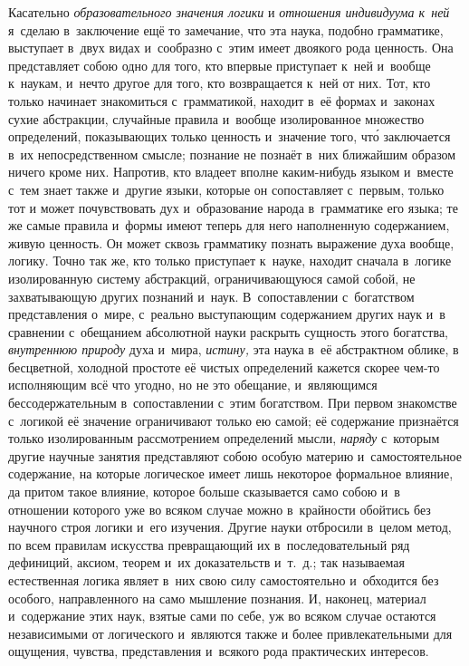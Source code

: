 Касательно {\em образовательного значения логики} и
{\em отношения индивидуума к~ней} я~сделаю в~заключение
ещё то замечание, что эта наука, подобно грамматике, выступает в~двух видах
и~сообразно с~этим имеет двоякого рода ценность. Она представляет собою
одно для того, кто впервые приступает к~ней и~вообще к~наукам, и~нечто
другое для того, кто возвращается к~ней от них. Тот, кто только начинает
знакомиться с~грамматикой, находит в~её формах и~законах сухие абстракции,
случайные правила и~вообще изолированное множество определений,
показывающих только ценность и~значение того, чт\'{о} заключается в~их
непосредственном смысле; познание не познаёт в~них ближайшим образом ничего
кроме них. Напротив, кто владеет вполне каким-нибудь языком и~вместе с~тем
знает также и~другие языки, которые он сопоставляет с~первым, только тот и
может почувствовать дух и~образование народа в~грамматике его языка; те же
самые правила и~формы имеют теперь для него наполненную содержанием, живую
ценность. Он может сквозь грамматику познать выражение духа вообще, логику.
Точно так же, кто только приступает к~науке, находит сначала в~логике
изолированную систему абстракций, ограничивающуюся самой собой, не
захватывающую других познаний и~наук. В~сопоставлении с~богатством
представления о~мире, с~реально выступающим содержанием других наук и~в
сравнении с~обещанием абсолютной науки раскрыть сущность этого богатства,
{\em внутреннюю природу} духа и~мира,
{\em истину,} эта наука в~её абстрактном облике, в
бесцветной, холодной простоте её чистых определений кажется скорее чем-то
исполняющим всё что угодно, но не это обещание, и~являющимся
бессодержательным в~сопоставлении с~этим богатством. При первом знакомстве
с~логикой её значение ограничивают только ею самой; её содержание
признаётся только изолированным рассмотрением определений мысли,
{\em наряду} с~которым другие научные занятия
представляют собою особую материю и~самостоятельное содержание, на которые
логическое имеет лишь некоторое формальное влияние, да притом такое
влияние, которое больше сказывается само собою и~в отношении которого уже
во всяком случае можно в~крайности обойтись без научного строя логики и~его
изучения. Другие науки отбросили в~целом метод, по всем правилам искусства
превращающий их в~последовательный ряд дефиниций, аксиом, теорем и~их
доказательств и~т.~д.; так называемая естественная логика являет в~них свою
силу самостоятельно и~обходится без особого, направленного на само мышление
познания. И, наконец, материал и~содержание этих наук, взятые сами по себе,
уж во всяком случае остаются независимыми от логического и~являются также и
более привлекательными для ощущения, чувства, представления и~всякого рода
практических интересов.

